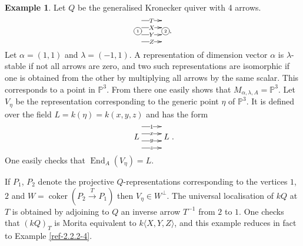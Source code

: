 \documentclass{amsart}
\numberwithin{equation}{section}
\let\blb\mathbb
\theoremstyle{definition}
\newtheorem{examples}[lemmas]{Example}
\theoremstyle{remark}
\begin{document}
\begin{examples}
\label{ref-2.5.6-16}
Let $Q$ be the generalised Kronecker quiver with 4 arrows.
\[
\xymatrix{
*+[o][F-]{\scriptscriptstyle 1} \ar@<3ex>[r]|{T} \ar@<1ex>[r]|{X} \ar@<-1ex>[r]|{Y}  \ar@<-3ex>[r]|{Z} &*+[o][F-]{\scriptscriptstyle 2}
}.
\]
Let $\alpha=(1,1)$ and $\lambda=(-1,1)$. A representation of dimension vector $\alpha$ is $\lambda$-stable if not all arrows are zero, and two such representations are isomorphic if one is obtained from the other by multiplying all arrows by the same scalar. This corresponds to a point in ${{\blb P}}^3$. From there one easily shows that $M_{\alpha,\lambda,A}={{\blb P}}^3$. Let $V_\eta$ be the representation corresponding to the generic point $\eta$ of ${{\blb P}}^3$. It is 
defined over the field $L=k(\eta)=k(x,y,z)$ and has the form 
\[
\xymatrix{
L \ar@<3ex>[r]|{1} \ar@<1ex>[r]|{x} \ar@<-1ex>[r]|{y}  \ar@<-3ex>[r]|z & L
}.
\]
One easily checks that ${\operatorname {End}}_{A}(V_\eta)=L$.

If $P_{1}$, $P_2$ denote the projective $Q$-representations corresponding to the vertices $1$, $2$ and $W={\operatorname {coker}}(P_2\xrightarrow{T} P_1)$ then $V_\eta\in W^\perp$.
The universal localisation of $kQ$ at $T$ is obtained by adjoining to $Q$ an inverse arrow $T^{-1}$ from $2$ to $1$. One checks that $(kQ)_T$ is Morita equivalent to 
$k\langle X,Y,Z\rangle$, and this example reduces in fact to Example \ref{ref-2.2.2-4}.
\end{examples}
\end{document}
